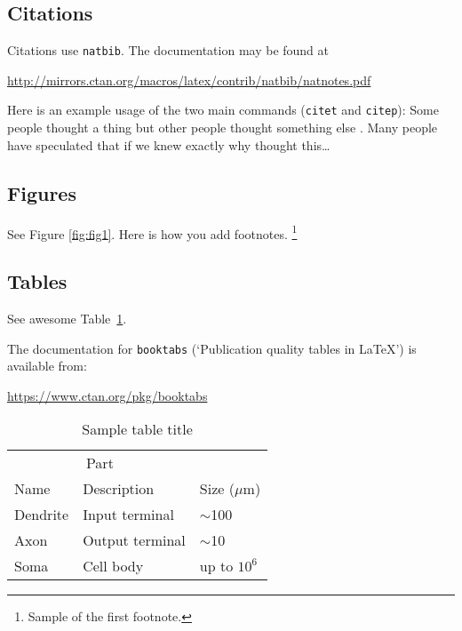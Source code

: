 \documentclass{article}
\begin{document}
\subsection{Citations}
Citations use \verb+natbib+. The documentation may be found at
\begin{center}
	\url{http://mirrors.ctan.org/macros/latex/contrib/natbib/natnotes.pdf}
\end{center}

Here is an example usage of the two main commands (\verb+citet+ and \verb+citep+): Some people thought a thing \citep{kour2014real, hadash2018estimate} but other people thought something else \citep{kour2014fast}. Many people have speculated that if we knew exactly why \citet{kour2014fast} thought this\dots

\subsection{Figures}
\lipsum[10]
See Figure \ref{fig:fig1}. Here is how you add footnotes. \footnote{Sample of the first footnote.}
\lipsum[11]


\subsection{Tables}
See awesome Table~\ref{tab:table}.

The documentation for \verb+booktabs+ (`Publication quality tables in LaTeX') is available from:
\begin{center}
	\url{https://www.ctan.org/pkg/booktabs}
\end{center}


\begin{table}
	\caption{Sample table title}
	\centering
	\begin{tabular}{lll}
		\toprule
		\multicolumn{2}{c}{Part}                   \\
		\cmidrule(r){1-2}
		Name     & Description     & Size ($\mu$m) \\
		\midrule
		Dendrite & Input terminal  & $\sim$100     \\
		Axon     & Output terminal & $\sim$10      \\
		Soma     & Cell body       & up to $10^6$  \\
		\bottomrule
	\end{tabular}
	\label{tab:table}
\end{table}
\end{document}
